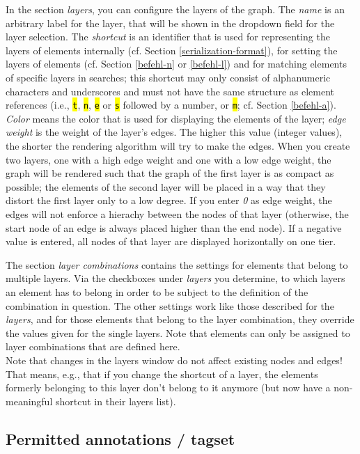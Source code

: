 \documentclass[12pt]{scrartcl}
\newcommand{\code}[1]{\hl{\texttt{#1}}}
\begin{document}
In the section \textit{layers}, you can configure the layers of the graph.
The \textit{name} is an arbitrary label for the layer, that will be shown in the dropdown field for the layer selection.
The \textit{shortcut} is an identifier that is used for representing the layers of elements internally (cf. Section \ref{serialization-format}), for setting the layers of elements (cf. Section \ref{befehl-n} or \ref{befehl-l}) and for matching elements of specific layers in searches; this shortcut may only consist of alphanumeric characters and underscores and must not have the same structure as element references (i.e., \code{t}, \code{n}, \code{e} or \code{s} followed by a number, or  \code{m}; cf. Section \ref{befehl-a}).
\textit{Color} means the color that is used for displaying the elements of the layer; \textit{edge weight} is the weight of the layer’s edges.
The higher this value (integer values), the shorter the rendering algorithm will try to make the edges.
When you create two layers, one with a high edge weight and one with a low edge weight, the graph will be rendered such that the graph of the first layer is as compact as possible; the elements of the second layer will be placed in a way that they distort the first layer only to a low degree.
If you enter \textit{0} as edge weight, the edges will not enforce a hierachy between the nodes of that layer (otherwise, the start node of an edge is always placed higher than the end node).
If a negative value is entered, all nodes of that layer are displayed horizontally on one tier.

The section \textit{layer combinations} contains the settings for elements that belong to multiple layers.
Via the checkboxes under \textit{layers} you determine, to which layers an element has to belong in order to be subject to the definition of the combination in question.
The other settings work like those described for the \textit{layers}, and for those elements that belong to the layer combination, they override the values given for the single layers.
Note that elements can only be assigned to layer combinations that are defined here.\\

Note that changes in the layers window do not affect existing nodes and edges!
That means, e.g., that if you change the shortcut of a layer, the elements formerly belonging to this layer don’t belong to it anymore (but now have a non-meaningful shortcut in their layers list).


\subsection{Permitted annotations / tagset}\label{erlaubteannotationen}
\end{document}
